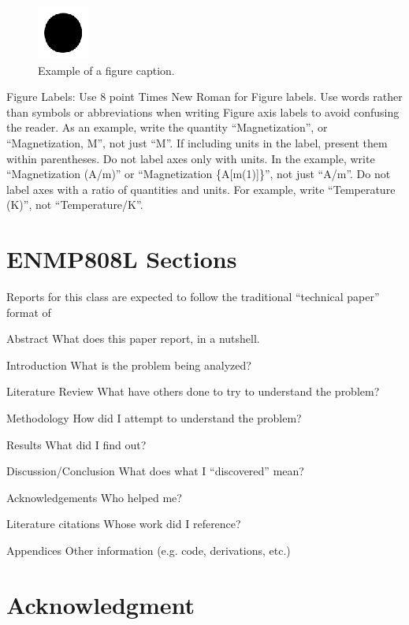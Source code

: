 \documentclass[journal]{IEEEtran}
\begin{document}
\begin{figure}[htbp]
\centerline{\includegraphics{fig1.eps}}
\caption{Example of a figure caption.}
\label{fig}
\end{figure}

Figure Labels: Use 8 point Times New Roman for Figure labels. 
Use words rather than symbols or abbreviations when writing Figure axis labels to avoid confusing the reader. 
As an example, write the quantity ``Magnetization'', or ``Magnetization, M'', not just ``M''. 
If including units in the label, present them within parentheses. 
Do not label axes only with units. 
In the example, write ``Magnetization (A/m)'' or ``Magnetization \{A[m(1)]\}'', not just ``A/m''. 
Do not label axes with a ratio of quantities and units. For example, write ``Temperature (K)'', not ``Temperature/K''.

\section{ENMP808L Sections}
\label{log:HWsections}
Reports for this class are expected to follow the traditional ``technical paper'' format of
\begin{LaTeXdescription}%
	\item[Abstract] What does this paper report, in a nutshell.
	\item[Introduction] What is the problem being analyzed?
	\item[Literature Review] What have others done to try to understand the problem?
	\item[Methodology] How did I attempt to understand the problem?
	\item[Results] What did I find out?
	\item[Discussion/Conclusion] What does what I ``discovered'' mean?
	\item[Acknowledgements] Who helped me?
	\item[Literature citations] Whose work did I reference?
	\item[Appendices] Other information (e.g. code, derivations, etc.)
\end{LaTeXdescription}

\section*{Acknowledgment}
\end{document}
